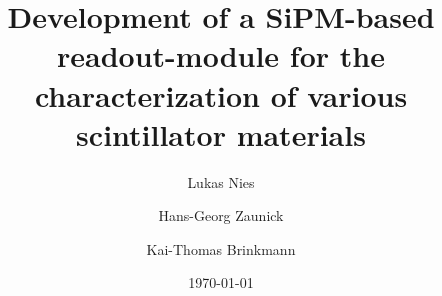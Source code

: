 \documentclass[%
 reprint,
 amsmath,amssymb,
 aps,
]{revtex4-1}
\begin{document}

\title{Development of a SiPM-based readout-module for the characterization of various scintillator materials}%

\author{Lukas Nies}
\author{Hans-Georg Zaunick}%
\author{Kai-Thomas Brinkmann}
%




\date{\today}%
\end{document}
